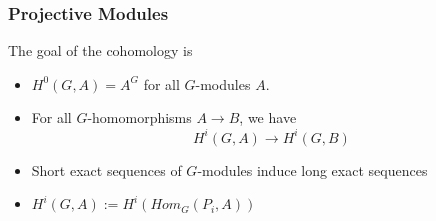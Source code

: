 \documentclass[10pt,xcolor=table,dvipsnames]{beamer}
\newenvironment{stepitemize}{\begin{itemize}[<+->]}{\end{itemize} }
\begin{document}
\begin{frame}[fragile]
\frametitle{Projective Modules}
\vspace{1cm}
\begin{center}
\end{center}

\vspace{1cm}

\vspace{1cm}

\end{frame}

\begin{frame}
The goal of the cohomology is
\begin{stepitemize}
\item $H^0 \left(G,A \right) = A^G$ for all $G$-modules $A$.
\item For all $G$-homomorphisms $A \longrightarrow B$, we have%
\begin{equation*}
H^i \left(G,A \right) \longrightarrow H^i \left(G,B \right)
\end{equation*}
\item Short exact sequences of $G$-modules induce long exact sequences
\item $H^i \left(G,A \right):= H^i \left(Hom_G\left(P_i,A \right)\right)$
\end{stepitemize}
\end{frame}
\end{document}
